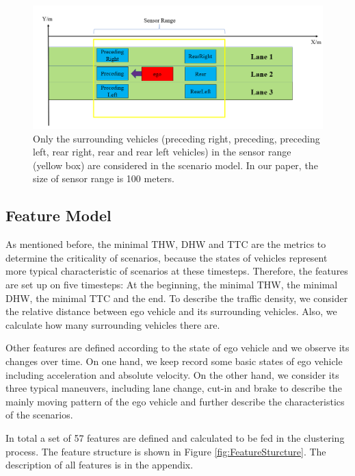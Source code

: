 \documentclass[conference]{IEEEtran}
\begin{document}
\begin{figure}[!h]
  \centering
  \includegraphics[width=6in]{./images/ScenarioModel.png}
  \caption{Only the surrounding vehicles (preceding right, preceding, preceding left, rear right, rear and rear left vehicles) in the sensor range (yellow box) are considered in the scenario model. In our paper, the size of sensor range is 100 meters.}
  \label{fig:ScenarioModel}
  \end{figure}
  

\subsection{Feature Model}
As mentioned before, the minimal THW, DHW and TTC are the metrics to determine the criticality of scenarios, because the states of vehicles represent more typical characteristic of scenarios at these timesteps. Therefore, the features are set up on five timesteps: At the beginning, the minimal THW, the minimal DHW, the minimal TTC and the end. To describe the traffic density, we consider the relative distance between ego vehicle and its surrounding vehicles. Also, we calculate how many surrounding vehicles there are.

Other features are defined according to the state of ego vehicle and we observe its changes over time. On one hand, we keep record some basic states of ego vehicle including acceleration and absolute velocity. On the other hand, we consider its three typical maneuvers, including lane change, cut-in and brake to describe the mainly moving pattern of the ego vehicle and further describe the characteristics of the scenarios.

In total a set of 57 features are defined and calculated to be fed in the clustering process. The feature structure is shown in Figure \ref{fig:FeatureSturcture}. The description of all features is in the appendix.
\end{document}
